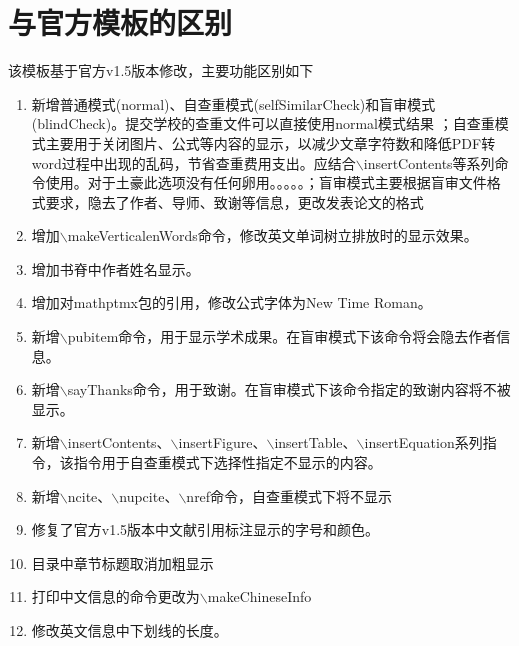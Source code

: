 \section{与官方模板的区别}
\label{section:与官方模板的区别}
该模板基于官方v1.5版本修改，主要功能区别如下
\begin{enumerate}
\item 新增普通模式(normal)、自查重模式(selfSimilarCheck)和盲审模式(blindCheck)。提交学校的查重文件可以直接使用normal模式结果
；自查重模式主要用于关闭图片、公式等内容的显示，以减少文章字符数和降低PDF转word过程中出现的乱码，节省查重费用支出。应结合$\backslash$insertContents等系列命令使用。对于土豪此选项没有任何卵用。。。。。；盲审模式主要根据盲审文件格式要求，隐去了作者、导师、致谢等信息，更改发表论文的格式
\item 增加$\backslash$makeVerticalenWords命令，修改英文单词树立排放时的显示效果。
\item 增加书脊中作者姓名显示。
\item 增加对mathptmx包的引用，修改公式字体为New Time Roman。
\item{新增$\backslash$pubitem命令，用于显示学术成果。在盲审模式下该命令将会隐去作者信息。}
\item{新增$\backslash$sayThanks命令，用于致谢。在盲审模式下该命令指定的致谢内容将不被显示。}
\item{新增$\backslash$insertContents、$\backslash$insertFigure、$\backslash$insertTable、$\backslash$insertEquation系列指令，该指令用于自查重模式下选择性指定不显示的内容。}
\item{新增$\backslash$ncite、$\backslash$nupcite、$\backslash$nref命令，自查重模式下将不显示}
\item{修复了官方v1.5版本中文献引用标注显示的字号和颜色。}
\item{目录中章节标题取消加粗显示}
\item{打印中文信息的命令更改为$\backslash$makeChineseInfo}
\item{修改英文信息中下划线的长度。}
\end{enumerate}